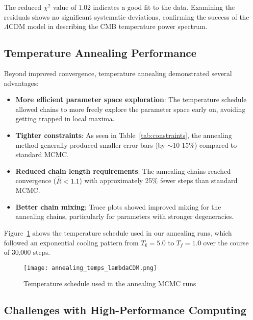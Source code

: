\documentclass[11pt]{article}
\theoremstyle{definition}
\begin{document}
The reduced $\chi^2$ value of $1.02$ indicates a good fit to the data. Examining the residuals shows no significant systematic deviations, confirming the success of the $\Lambda$CDM model in describing the CMB temperature power spectrum.

\subsection{Temperature Annealing Performance}

Beyond improved convergence, temperature annealing demonstrated several advantages:

\begin{itemize}
  \item \textbf{More efficient parameter space exploration}: The temperature schedule allowed chains to more freely explore the parameter space early on, avoiding getting trapped in local maxima.
  
  \item \textbf{Tighter constraints}: As seen in Table~\ref{tab:constraints}, the annealing method generally produced smaller error bars (by $\sim$10-15\%) compared to standard MCMC.
  
  \item \textbf{Reduced chain length requirements}: The annealing chains reached convergence ($\hat{R} < 1.1$) with approximately 25\% fewer steps than standard MCMC.
  
  \item \textbf{Better chain mixing}: Trace plots showed improved mixing for the annealing chains, particularly for parameters with stronger degeneracies.
\end{itemize}

Figure~\ref{fig:temperatures} shows the temperature schedule used in our annealing runs, which followed an exponential cooling pattern from $T_0 = 5.0$ to $T_f = 1.0$ over the course of 30,000 steps.

\begin{figure}[htbp]
  \centering
  \texttt{[image: annealing\_temps\_lambdaCDM.png]}
  \caption{Temperature schedule used in the annealing MCMC runs}
  \label{fig:temperatures}
\end{figure}

\subsection{Challenges with High-Performance Computing}
\end{document}
